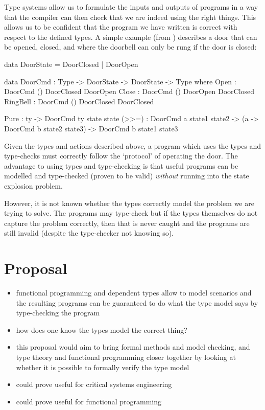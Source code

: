 \documentclass[11pt]{article}
\begin{document}
    Type systems allow us to formulate the inputs and outputs of programs in a way that the compiler can then check that we are indeed using the right things. This allows us to be confident that the program we have written is correct with respect to the defined types. A simple example (from \cite{brady_type-driven_2017}) describes a door that can be opened, closed, and where the doorbell can only be rung if the door is closed:
    \begin{idrislisting}
data DoorState = DoorClosed | DoorOpen

data DoorCmd : Type -> DoorState -> DoorState -> Type
  where
    Open : DoorCmd     () DoorClosed DoorOpen
    Close : DoorCmd    () DoorOpen DoorClosed
    RingBell : DoorCmd () DoorClosed DoorClosed
    
    Pure : ty -> DoorCmd ty state state
    (>>=) : DoorCmd a state1 state2 ->
            (a -> DoorCmd b state2 state3) ->
            DoorCmd b state1 state3
    \end{idrislisting}
    Given the types and actions described above, a program which uses the types
    and type-checks must correctly follow the `protocol' of operating the door.
    The advantage to using types and type-checking is that useful programs can
    be modelled and type-checked (proven to be valid) \textit{without}
    running into the state explosion problem.
    
    However, it is not known whether the types correctly model the problem we
    are trying to solve. The programs may type-check but if the types themselves
    do not capture the problem correctly, then that is never caught and the
    programs are still invalid (despite the type-checker not knowing so).
    
    \section*{Proposal}
    \begin{itemize}
        \item functional programming and dependent types allow to model
              scenarios and the resulting programs can be guaranteed to do what
              the type model says by type-checking the program
        \item how does one know the types model the correct thing?
        \item this proposal would aim to bring formal methods and model
              checking, and type theory and functional programming closer
              together by looking at whether it is possible to formally verify
              the type model
        \item could prove useful for critical systems engineering
        \item could prove useful for functional programming
    \end{itemize}
    
\end{document}
